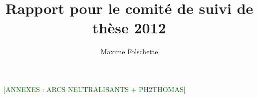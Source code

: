 \documentclass[11pt]{report}
\title{Rapport pour le comité de suivi de thèse 2012}
\author{Maxime Folschette}
\newcommand{\todo}[1]{\textcolor{darkgreen}{[#1]}}
\begin{document}
\maketitle

\tableofcontents










\newpage
\todo{ANNEXES : ARCS NEUTRALISANTS + PH2THOMAS}
\end{document}
